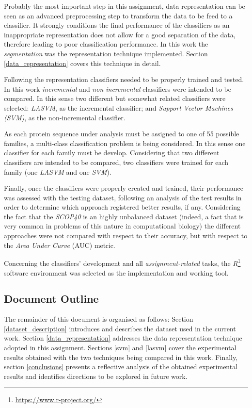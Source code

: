 \documentclass[11pt]{article}
\begin{document}
Probably the most important step in this assignment, data representation can be seen as an advanced preprocessing step to transform the data to be feed to a classifier. It strongly conditions the final performance of the classifiers as an inappropriate representation does not allow for a good separation of the data, therefore leading to poor classification performance. In this work the \emph{segmentation} was the representation technique implemented. Section \ref{data_representation} covers this technique in detail.

Following the representation classifiers needed to be properly trained and tested. In this work \emph{incremental} and \emph{non-incremental} classifiers were intended to be compared. In this sense two different but somewhat related classifiers were selected: \emph{LASVM}, as the incremental classifier; and \emph{Support Vector Machines (SVM)}, as the non-incremental classifier.

As each protein sequence under analysis must be assigned to one of 55 possible families, a multi-class classification problem is being considered. In this sense one classifier for each family must be develop. Considering that two different classifiers are intended to be compared, two classifiers were trained for each family (one \emph{LASVM} and one \emph{SVM}).

Finally, once the classifiers were properly created and trained, their performance was assessed with the testing dataset, following an analysis of the test results in order to determine which approach registered better results, if any. Considering the fact that the \emph{SCOP40} is an highly unbalanced dataset (indeed, a fact that is very common in problems of this nature in computational biology) the different approaches were not compared with respect to their accuracy, but with respect to the \emph{Area Under Curve} (AUC) metric.

Concerning the classifiers' development and all \emph{assignment-related} tasks, the \emph{R}\footnote{\url{https://www.r-project.org/}} software environment was selected as the implementation and working tool.

\subsection{Document Outline}

The remainder of this document is organised as follows: Section \ref{dataset_description} introduces and describes the dataset used in the current work. Section \ref{data_representation} addresses the data representation technique adopted in this assignment. Sections \ref{svm} and \ref{lasvm} cover the experimental results obtained with the two techniques being compared in this work. Finally, section \ref{conclusions} presents a reflective analysis of the obtained experimental results and identifies directions to be explored in future work.
\end{document}
